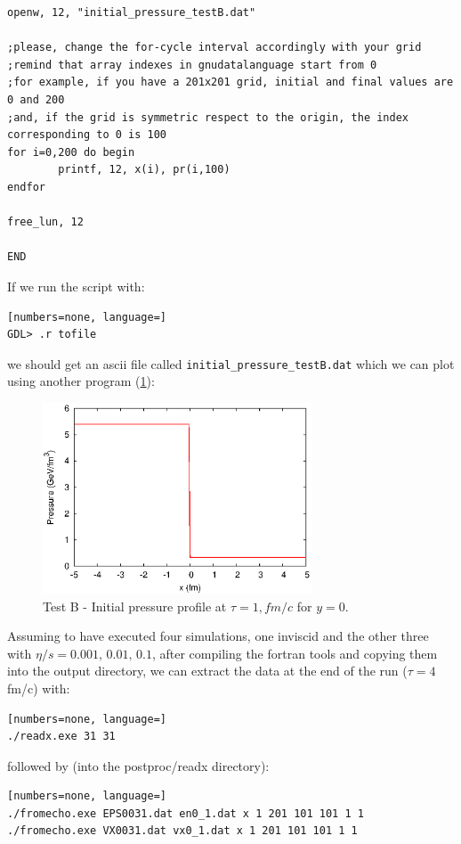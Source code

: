 \begin{lstlisting}[numbers=none, language=IDL]
openw, 12, "initial_pressure_testB.dat" 

;please, change the for-cycle interval accordingly with your grid
;remind that array indexes in gnudatalanguage start from 0
;for example, if you have a 201x201 grid, initial and final values are 0 and 200
;and, if the grid is symmetric respect to the origin, the index corresponding to 0 is 100
for i=0,200 do begin
        printf, 12, x(i), pr(i,100)
endfor

free_lun, 12

END 
\end{lstlisting}
If we run the script with:
\begin{lstlisting}[numbers=none, language=]
GDL> .r tofile
\end{lstlisting}
we should get an ascii file called {\tt initial\_pressure\_testB.dat} which we can plot using another program (\ref{testB_init_pressure}):
\begin{figure}[!h]
 \begin{center}
  \includegraphics[width=8cm]{images/initial_pressure_testB.eps}
   \caption{Test B - Initial pressure profile at $\tau=1,fm/c$ for $y=0$.}
    \label{testB_init_pressure}
 \end{center}
\end{figure}
Assuming to have executed four simulations, one inviscid and the other three with $\eta/s=0.001,\,0.01,\,0.1$, after compiling the fortran tools and copying them into the output directory, we can extract the data at the end of the run ($\tau=4$ fm/c) with:
\begin{lstlisting}[numbers=none, language=]
./readx.exe 31 31
\end{lstlisting}
followed by (into the postproc/readx directory):
\begin{lstlisting}[numbers=none, language=]
./fromecho.exe EPS0031.dat en0_1.dat x 1 201 101 101 1 1 
./fromecho.exe VX0031.dat vx0_1.dat x 1 201 101 101 1 1
\end{lstlisting}

